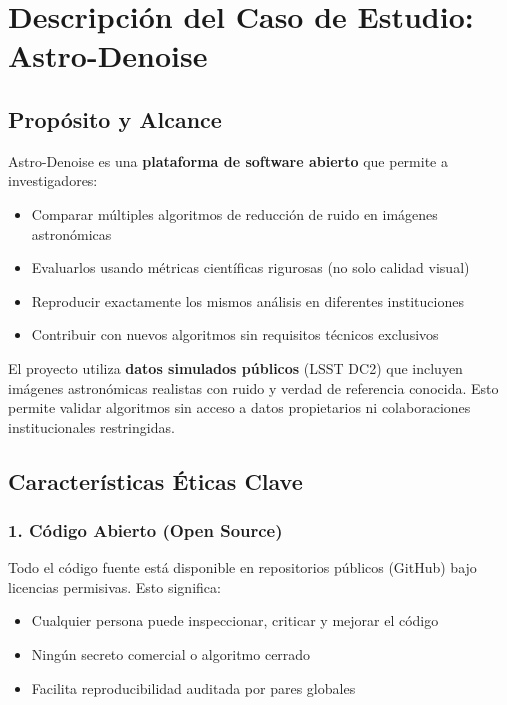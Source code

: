 \section{Descripción del Caso de Estudio: Astro-Denoise}

\subsection{Propósito y Alcance}

Astro-Denoise es una \textbf{plataforma de software abierto} que permite a investigadores:

\begin{itemize}
    \item Comparar múltiples algoritmos de reducción de ruido en imágenes astronómicas
    \item Evaluarlos usando métricas científicas rigurosas (no solo calidad visual)
    \item Reproducir exactamente los mismos análisis en diferentes instituciones
    \item Contribuir con nuevos algoritmos sin requisitos técnicos exclusivos
\end{itemize}

El proyecto utiliza \textbf{datos simulados públicos} (LSST DC2) que incluyen imágenes astronómicas realistas con ruido y verdad de referencia conocida. Esto permite validar algoritmos sin acceso a datos propietarios ni colaboraciones institucionales restringidas.

\subsection{Características Éticas Clave}

\subsubsection{1. Código Abierto (Open Source)}

Todo el código fuente está disponible en repositorios públicos (GitHub) bajo licencias permisivas. Esto significa:

\begin{itemize}
    \item Cualquier persona puede inspeccionar, criticar y mejorar el código
    \item Ningún secreto comercial o algoritmo cerrado
    \item Facilita reproducibilidad auditada por pares globales
\end{itemize}

